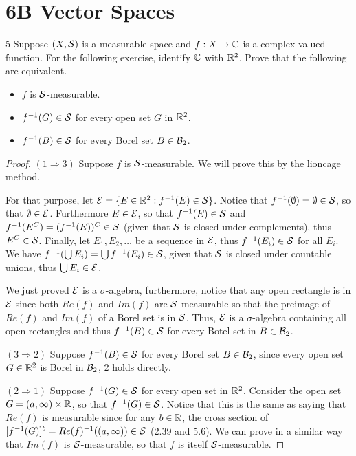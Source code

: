 \section{6B Vector Spaces}


\begin{exercise}{5}
Suppose $(X, \mathcal{S})$ is a measurable space and $f: X \to \mathbb{C}$ is a complex-valued function.
For the following exercise, identify $\mathbb{C}$ with $\mathbb{R}^2$.
Prove that the following are equivalent.
\begin{itemize}
    \item $f$ is $\mathcal{S}$-measurable.
    \item $f^{-1}(G) \in \mathcal{S}$ for every open set $G$ in $\mathbb{R}^2$.
    \item $f^{-1}(B) \in \mathcal{S}$ for every Borel set $B \in \mathcal{B}_2$.
\end{itemize}
\end{exercise}
\begin{proof}
$(1 \Rightarrow 3)$
Suppose $f$ is $\mathcal{S}$-measurable.
We will prove this by the lioncage method.

For that purpose, let $\mathcal{E} = \{E \in \mathbb{R}^2: f^{-1}(E) \in \mathcal{S}\}$.
Notice that $f^{-1}(\emptyset) = \emptyset \in \mathcal{S}$, so that $\emptyset \in \mathcal{E}$.
Furthermore $E \in \mathcal{E}$, so that $f^{-1}(E) \in \mathcal{S}$ and $f^{-1}(E^C) = (f^{-1}(E))^C \in \mathcal{S}$ (given that $\mathcal{S}$ is closed under complements), thus $E^C \in \mathcal{S}$.
Finally, let $E_1, E_2, \dots$ be a sequence in $\mathcal{E}$, thus $f^{-1}(E_i) \in \mathcal{S}$ for all $E_i$.
We have $f^{-1}(\bigcup E_i) = \bigcup f^{-1}(E_i) \in \mathcal{S}$, given that $\mathcal{S}$ is closed under countable unions, thus $\bigcup E_i \in \mathcal{E}$.

We just proved $\mathcal{E}$ is a $\sigma$-algebra, furthermore, notice that any open rectangle is in $\mathcal{E}$ since both $Re(f)$ and $Im(f)$ are $\mathcal{S}$-measurable so that the preimage of $Re(f)$ and $Im(f)$ of a Borel set is in $\mathcal{S}$.
Thus, $\mathcal{E}$ is a $\sigma$-algebra containing all open rectangles and thus $f^{-1}(B) \in \mathcal{S}$ for every Botel set in $B \in \mathcal{B}_2$.

$(3 \Rightarrow 2)$
Suppose $f^{-1}(B) \in \mathcal{S}$ for every Borel set $B \in \mathcal{B}_2$, since every open set $G \in \mathbb{R}^2$ is Borel in $\mathcal{B}_2$, 2 holds directly.

$(2 \Rightarrow 1)$
Suppose $f^{-1}(G) \in \mathcal{S}$ for every open set in $\mathbb{R}^2$.
Consider the open set $G = (a, \infty) \times \mathbb{R}$, so that  $f^{-1}(G) \in \mathcal{S}$.
Notice that this is the same as saying that $Re(f)$ is measurable since for any $b \in \mathbb{R}$, the cross section of $[f^{-1}(G)]^b = Re(f)^{-1}((a,\infty)) \in \mathcal{S}$ (2.39 and 5.6).
We can prove in a similar way that $Im(f)$ is $\mathcal{S}$-measurable, so that $f$ is itself $\mathcal{S}$-measurable.
\end{proof} 


